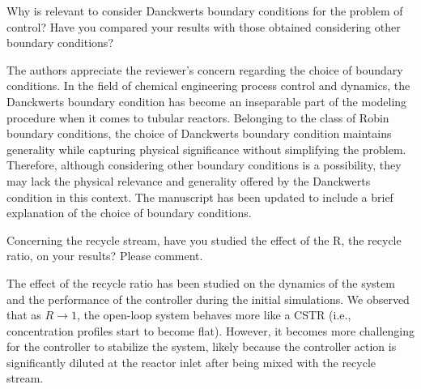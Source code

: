 \documentclass[11pt,answers]{exam}
\begin{document}
\begin{questions}

    \question Why is relevant to consider Danckwerts boundary conditions for the problem of control? Have you compared your results with those obtained considering other boundary conditions?

    \begin{solutionorbox} \label{comment:2_1}
        The authors appreciate the reviewer's concern regarding the choice of boundary conditions. In the field of chemical engineering process control and dynamics, the Danckwerts boundary condition has become an inseparable part of the modeling procedure when it comes to tubular reactors. Belonging to the class of Robin boundary conditions, the choice of Danckwerts boundary condition maintains generality while capturing physical significance without simplifying the problem. Therefore, although considering other boundary conditions is a possibility, they may lack the physical relevance and generality offered by the Danckwerts condition in this context. The manuscript has been updated to include a brief explanation of the choice of boundary conditions.
    \end{solutionorbox}


    \question Concerning the recycle stream, have you studied the effect of the R, the recycle ratio, on your results? Please comment.

    \begin{solutionorbox} \label{comment:2_2}
        The effect of the recycle ratio has been studied on the dynamics of the system and the performance of the controller during the initial simulations. We observed that as \( R \to 1 \), the open-loop system behaves more like a CSTR (i.e., concentration profiles start to become flat). However, it becomes more challenging for the controller to stabilize the system, likely because the controller action is significantly diluted at the reactor inlet after being mixed with the recycle stream.


\end{solutionorbox}
\end{questions}
\end{document}
